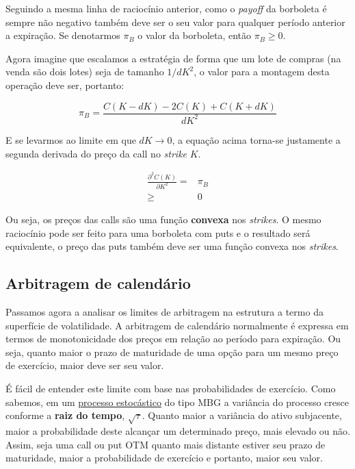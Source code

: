 \documentclass[]{book}
\begin{document}
Seguindo a mesma linha de raciocínio anterior, como o \emph{payoff} da
borboleta é sempre não negativo também deve ser o seu valor para
qualquer período anterior a expiração. Se denotarmos \(\pi_B\) o valor
da borboleta, então \(\pi_B\geq0\).

Agora imagine que escalamos a estratégia de forma que um lote de compras
(na venda são dois lotes) seja de tamanho \(1/dK^2\), o valor para a
montagem desta operação deve ser, portanto:

\begin{equation}
\pi_B=\frac{C(K-dK)-2C(K)+C(K+dK)}{dK^2}
\end{equation}

E se levarmos ao limite em que \(dK\rightarrow 0\), a equação acima
torna-se justamente a segunda derivada do preço da call no \emph{strike}
\(K\).

\begin{equation}
\begin{aligned}
\frac{\partial^2 C(K)}{\partial K^2}=& \pi_B\\
\geq & 0
\end{aligned}
\label{eq:arbborboleta}
\end{equation}

Ou seja, os preços das calls são uma função \textbf{convexa} nos
\emph{strikes}. O mesmo raciocínio pode ser feito para uma borboleta com
puts e o resultado será equivalente, o preço das puts também deve ser
uma função convexa nos \emph{strikes}.

\subsection{Arbitragem de calendário}\label{arbitragem-de-calendario}

Passamos agora a analisar os limites de arbitragem na estrutura a termo
da superfície de volatilidade. A arbitragem de calendário normalmente é
expressa em termos de monotonicidade dos preços em relação ao período
para expiração. Ou seja, quanto maior o prazo de maturidade de uma opção
para um mesmo preço de exercício, maior deve ser seu valor.

É fácil de entender este limite com base nas probabilidades de
exercício. Como sabemos, em um
\protect\hyperlink{processos-estocasticos}{processo estocástico} do tipo
MBG a variância do processo cresce conforme a \textbf{raiz do tempo},
\(\sqrt{\tau}\). Quanto maior a variância do ativo subjacente, maior a
probabilidade deste alcançar um determinado preço, mais elevado ou não.
Assim, seja uma call ou put OTM quanto mais distante estiver seu prazo
de maturidade, maior a probabilidade de exercício e portanto, maior seu
valor.
\end{document}
